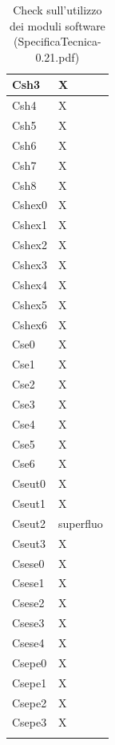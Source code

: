 \begin{footnotesize}
\begin{longtable}{|p{}|p{}|}
 Csh3 &X  \\ \hline
 Csh4 &X  \\ \hline
 Csh5 &X  \\ \hline
 Csh6 &X  \\ \hline
 Csh7 &X  \\ \hline
 Csh8 &X  \\ \hline
 Cshex0 &X  \\ \hline
 Cshex1 &X  \\ \hline
 Cshex2 &X  \\ \hline
 Cshex3 &X  \\ \hline
 Cshex4 &X  \\ \hline
 Cshex5 &X  \\ \hline
 Cshex6 &X  \\ \hline
 Cse0 &X  \\ \hline
 Cse1 &X  \\ \hline
 Cse2 &X  \\ \hline
 Cse3 &X  \\ \hline
 Cse4 &X  \\ \hline
 Cse5 &X  \\ \hline
 Cse6 &X  \\ \hline
 Cseut0 &X  \\ \hline
 Cseut1 &X  \\ \hline
 Cseut2 &superfluo  \\ \hline
 Cseut3 &X  \\ \hline
 Csese0 &X  \\ \hline
 Csese1 &X  \\ \hline
 Csese2 &X  \\ \hline
 Csese3 &X  \\ \hline
 Csese4 &X  \\ \hline
 Csepe0 &X  \\ \hline
 Csepe1 &X  \\ \hline
 Csepe2 &X  \\ \hline
 Csepe3 &X  \\ \hline

\caption{Check sull'utilizzo dei moduli software (SpecificaTecnica-0.21.pdf)}
\end{longtable}
\end{footnotesize}

